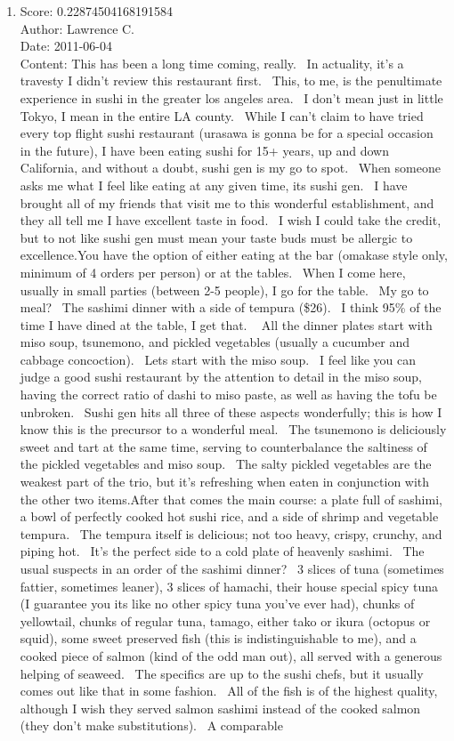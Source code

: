 \documentclass[paper=a4, fontsize=11pt]{jhwhw} %
\begin{document}
\begin{itemize}
\begin{enumerate}
            \item Score: 0.22874504168191584\\
                Author: Lawrence C.\\
                Date: 2011-06-04\\
                Content: This has been a long time coming, really.  In actuality, it's a travesty I didn't review this restaurant first.  This, to me, is the penultimate experience in sushi in the greater los angeles area.  I don't mean just in little Tokyo, I mean in the entire LA county.  While I can't claim to have tried every top flight sushi restaurant (urasawa is gonna be for a special occasion in the future), I have been eating sushi for 15+ years, up and down California, and without a doubt, sushi gen is my go to spot.  When someone asks me what I feel like eating at any given time, its sushi gen.  I have brought all of my friends that visit me to this wonderful establishment, and they all tell me I have excellent taste in food.  I wish I could take the credit, but to not like sushi gen must mean your taste buds must be allergic to excellence.You have the option of either eating at the bar (omakase style only, minimum of 4 orders per person) or at the tables.  When I come here, usually in small parties (between 2-5 people), I go for the table.  My go to meal?  The sashimi dinner with a side of tempura (\$26).  I think 95\% of the time I have dined at the table, I get that.   All the dinner plates start with miso soup, tsunemono, and pickled vegetables (usually a cucumber and cabbage concoction).  Lets start with the miso soup.  I feel like you can judge a good sushi restaurant by the attention to detail in the miso soup, having the correct ratio of dashi to miso paste, as well as having the tofu be unbroken.  Sushi gen hits all three of these aspects wonderfully; this is how I know this is the precursor to a wonderful meal.  The tsunemono is deliciously sweet and tart at the same time, serving to counterbalance the saltiness of the pickled vegetables and miso soup.  The salty pickled vegetables are the weakest part of the trio, but it's refreshing when eaten in conjunction with the other two items.After that comes the main course: a plate full of sashimi, a bowl of perfectly cooked hot sushi rice, and a side of shrimp and vegetable tempura.  The tempura itself is delicious; not too heavy, crispy, crunchy, and piping hot.  It's the perfect side to a cold plate of heavenly sashimi.  The usual suspects in an order of the sashimi dinner?  3 slices of tuna (sometimes fattier, sometimes leaner), 3 slices of hamachi, their house special spicy tuna (I guarantee you its like no other spicy tuna you've ever had), chunks of yellowtail, chunks of regular tuna, tamago, either tako or ikura (octopus or squid), some sweet preserved fish (this is indistinguishable to me), and a cooked piece of salmon (kind of the odd man out), all served with a generous helping of seaweed.  The specifics are up to the sushi chefs, but it usually comes out like that in some fashion.  All of the fish is of the highest quality, although I wish they served salmon sashimi instead of the cooked salmon (they don't make substitutions).  A comparable 
\end{enumerate}
\end{itemize}
\end{document}
